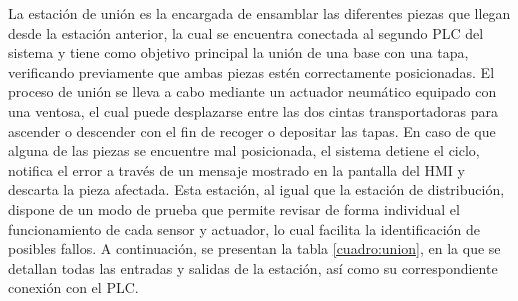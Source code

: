 La estación de unión es la encargada de ensamblar las diferentes piezas que llegan desde la estación anterior, la cual se encuentra conectada al segundo PLC del sistema y tiene como objetivo principal la unión de una base con una tapa, verificando previamente que ambas piezas estén correctamente posicionadas. El proceso de unión se lleva a cabo mediante un actuador neumático equipado con una ventosa, el cual puede desplazarse entre las dos cintas transportadoras para ascender o descender con el fin de recoger o depositar las tapas. En caso de que alguna de las piezas se encuentre mal posicionada, el sistema detiene el ciclo, notifica el error a través de un mensaje mostrado en la pantalla del HMI y descarta la pieza afectada. Esta estación, al igual que la estación de distribución, dispone de un modo de prueba que permite revisar de forma individual el funcionamiento de cada sensor y actuador, lo cual facilita la identificación de posibles fallos. A continuación, se presentan la tabla \ref{cuadro:union}, en la que se detallan todas las entradas y salidas de la estación, así como su correspondiente conexión con el PLC.


